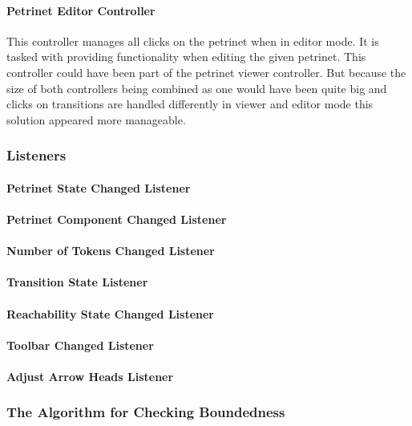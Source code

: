 \documentclass[10pt, a4paper]{article}
\begin{document}
\paragraph{Petrinet Editor Controller} This controller manages all clicks on the petrinet when in editor mode. It is tasked with providing functionality when editing the given petrinet. This controller could have been part of the petrinet viewer controller. But because the size of both controllers being combined as one would have been quite big and clicks on transitions are handled differently in viewer and editor mode this solution appeared more manageable.

\subsubsection{Listeners}

\paragraph{Petrinet State Changed Listener}
\paragraph{Petrinet Component Changed Listener}
\paragraph{Number of Tokens Changed Listener}
\paragraph{Transition State Listener}
\paragraph{Reachability State Changed Listener}
\paragraph{Toolbar Changed Listener}
\paragraph{Adjust Arrow Heads Listener}

\subsubsection{The Algorithm for Checking Boundedness}
\label{label:algorithm}
\end{document}
